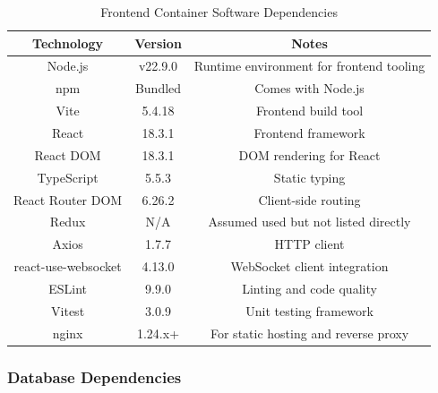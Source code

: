 \begin{table}[H]
    \centering
    \begin{tabular}{|c|c|c|}
        \hline
        \textbf{Technology} & \textbf{Version} & \textbf{Notes}                           \\
        \hline
        Node.js             & v22.9.0          & Runtime environment for frontend tooling \\
        \hline
        npm                 & Bundled          & Comes with Node.js                       \\
        \hline
        Vite                & 5.4.18           & Frontend build tool                      \\
        \hline
        React               & 18.3.1           & Frontend framework                       \\
        \hline
        React DOM           & 18.3.1           & DOM rendering for React                  \\
        \hline
        TypeScript          & 5.5.3            & Static typing                            \\
        \hline
        React Router DOM    & 6.26.2           & Client-side routing                      \\
        \hline
        Redux               & N/A              & Assumed used but not listed directly     \\
        \hline
        Axios               & 1.7.7            & HTTP client                              \\
        \hline
        react-use-websocket & 4.13.0           & WebSocket client integration             \\
        \hline
        ESLint              & 9.9.0            & Linting and code quality                 \\
        \hline
        Vitest              & 3.0.9            & Unit testing framework                   \\
        \hline
        nginx               & 1.24.x+          & For static hosting and reverse proxy     \\
        \hline
    \end{tabular}
    \caption{Frontend Container Software Dependencies}
    \label{tab:frontend_dependencies}
\end{table}

\subsubsection{Database Dependencies}

